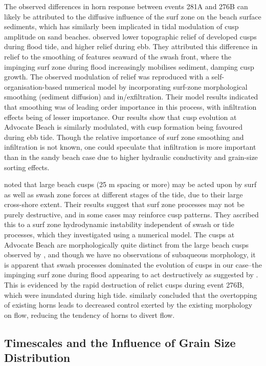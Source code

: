 The observed differences in horn response between events 281A and 276B can likely be attributed to the diffusive influence of the surf zone on the beach surface sediments, which has similarly been implicated in tidal modulation of cusp amplitude on sand beaches. \citet{Coco_etal2004} observed lower topographic relief of developed cusps during flood tide, and higher relief during ebb. They attributed this difference in relief to the smoothing of features seaward of the swash front, where the impinging surf zone during flood increasingly mobilises sediment, damping cusp growth. The observed modulation of relief was reproduced with a self-organisation-based numerical model by incorporating surf-zone morphological smoothing (sediment diffusion) and in/exfiltration. Their model results indicated that smoothing was of leading order importance in this process, with infiltration effects being of lesser importance. Our results show that cusp evolution at Advocate Beach is similarly modulated, with cusp formation being favoured during ebb tide. Though the relative importance of surf zone smoothing and infiltration is not known, one could speculate that infiltration is more important than in the sandy beach case due to higher hydraulic conductivity and grain-size sorting effects. 

\citet{Garnier_etal2010} noted that large beach cusps (25 m spacing or more) may be acted upon by surf as well as swash zone forces at different stages of the tide, due to their large cross-shore extent. Their results suggest that surf zone processes may not be purely destructive, and in some cases may reinforce cusp patterns. They ascribed this to a surf zone hydrodynamic instability independent of swash or tide processes, which they investigated using a numerical model. The cusps at Advocate Beach are morphologically quite distinct from the large beach cusps observed by \citet{Garnier_etal2010}, and though we have no observations of subaqueous morphology, it is apparent that swash processes dominated the evolution of cusps in our case--the impinging surf zone during flood appearing to act destructively as suggested by \citet{Coco_etal2004}. This is evidenced by the rapid destruction of relict cusps during event 276B, which were inundated during high tide. \citet{Almar_etal2008} similarly concluded that the overtopping of existing horns leads to decreased control exerted by the existing morphology on flow, reducing the tendency of horns to divert flow.


\subsection{Timescales and the Influence of Grain Size Distribution}\label{subsec:Timescales}


